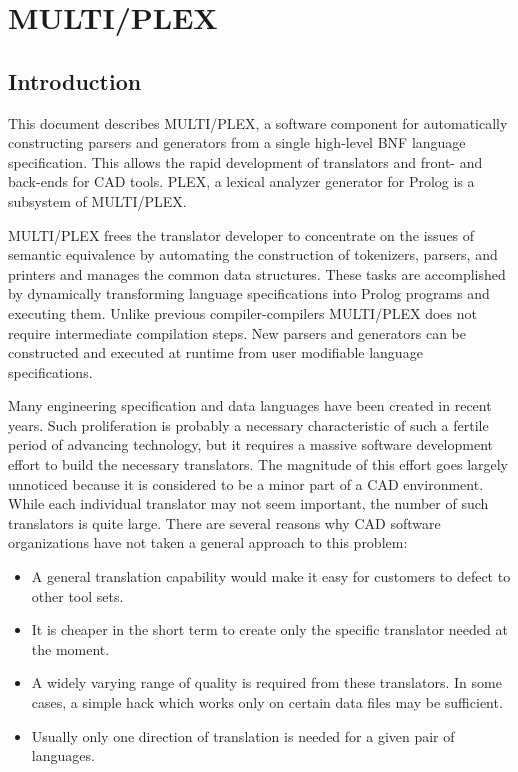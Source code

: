 \hfuzz 10.0pt

\chapter{MULTI/PLEX}

\section{Introduction}
This document describes MULTI/PLEX, a software component
for automatically constructing parsers and generators from 
a single high-level BNF language specification.
This allows the rapid development of 
translators and front- and back-ends for CAD tools.
PLEX, a lexical analyzer generator for Prolog is a
subsystem of MULTI/PLEX.

MULTI/PLEX frees the translator developer to concentrate
on the issues of semantic equivalence by automating
the construction of tokenizers, parsers, and printers
and manages the common data structures.
These tasks are accomplished by dynamically transforming
language specifications into Prolog programs and
executing them. Unlike previous compiler-compilers MULTI/PLEX
does not require intermediate compilation steps. 
New parsers and generators can be constructed and executed
at runtime from user modifiable language specifications.

Many engineering specification and data languages
have been created in recent years.
Such proliferation is probably a necessary characteristic
of such a fertile period of advancing technology,
but it requires a massive software development effort
to build the necessary translators.  The magnitude of
this effort goes largely unnoticed because it is
considered to be a minor part of a CAD
environment. While each individual
translator may not seem important, the number of 
such translators is quite large. There are
several reasons why CAD software organizations
have not taken a general approach to this problem:

\begin{itemize}

\item{}
A general translation capability would make it
easy for customers to defect to other tool sets.

\item{}
It is cheaper in the short term to create only
the specific translator needed at the moment.

\item{}
A widely varying range of quality is required from these
translators. In some cases, a simple hack which works only
on certain data files may be sufficient.

\item{}
Usually only one direction of translation is needed
for a given pair of languages.

\end{itemize}

